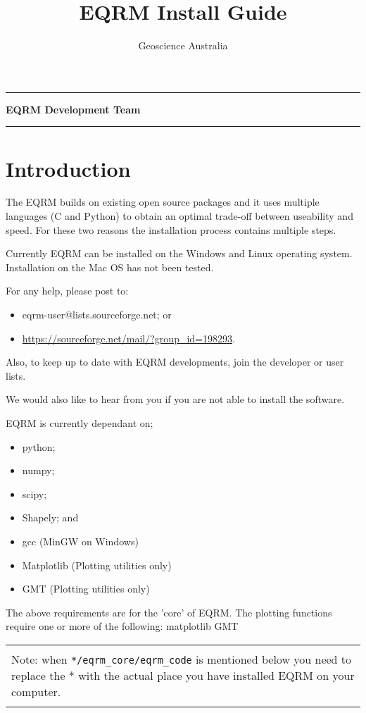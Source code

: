 \documentclass[a4paper, 12pt]{article}
\title{EQRM Install Guide}
\author{Geoscience Australia}
\makeatletter
\def\maketitle{%
\null
\thispagestyle{empty}%
\hrule height 0.5pt \vskip 2.5cm
\begin{center}
\normalfont
{\Large \textbf\@title\par}%
\vskip 2.5cm \normalsize \textbf{EQRM Development Team} \vskip 2.5cm
{\normalsize \textbf \@author\par}%
\vskip 4.53cm
{\normalsize \textbf \@date\par}%
\vskip 3.5cm \hrule height 0.5pt
\end{center}%
\null \clearpage }
\makeatother
\begin{document}
\maketitle

\section{Introduction}

The EQRM builds on existing open source packages and it uses
multiple languages (C and Python) to obtain an optimal trade-off
between useability and speed. For these two reasons the installation
process contains multiple steps.

Currently EQRM can be installed on the Windows and Linux operating
system. Installation on the Mac OS has not been tested.

For any help, please post to:
\begin{itemize}
\item eqrm-user@lists.sourceforge.net; or
\item \url{https://sourceforge.net/mail/?group_id=198293}.
\end{itemize}
Also, to keep up to date with EQRM developments, join the developer
or user lists.

We would also like to hear from you if you are not able to install
the software.

EQRM is currently dependant on;
\begin{itemize}
\item python;
\item numpy;
\item scipy;
\item Shapely; and
\item gcc (MinGW on Windows)
\item Matplotlib (Plotting utilities only)
\item GMT (Plotting utilities only)
\end{itemize}

The above requirements are for the 'core' of EQRM. The plotting
functions require one or more of the following: matplotlib GMT

\begin{supertabular}{|p{1\textwidth}|}
\hline  \\
 Note: when \texttt{*/eqrm\_core/eqrm\_code} is mentioned
below you need to replace the * with the actual place you have
installed EQRM on your computer.  \\
\\ \hline
\end{supertabular}
\end{document}
